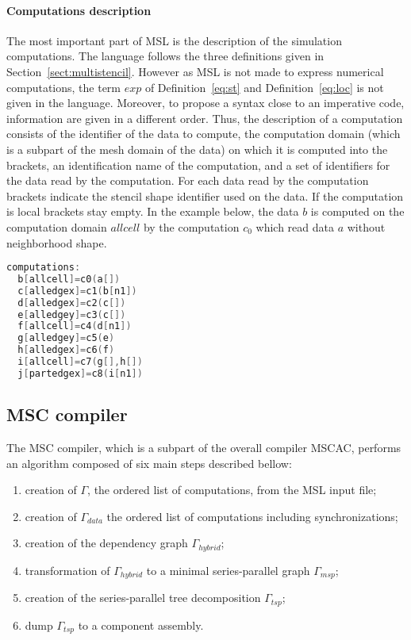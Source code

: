 \paragraph{Computations description} The most important part of MSL is the description of the simulation computations. The language follows the three definitions given in Section~\ref{sect:multistencil}. However as MSL is not made to express numerical computations, the term $exp$ of Definition~\ref{eq:st} and Definition~\ref{eq:loc} is not given in the language. Moreover, to propose a syntax close to an imperative code, information are given in a different order.
Thus, the description of a computation consists of the identifier of the data to compute, the computation domain (which is a subpart of the mesh domain of the data) on which it is computed into the brackets, an identification name of the computation, and a set of identifiers for the data read by the computation. For each data read by the computation brackets indicate the stencil shape identifier used on the data. If the computation is local brackets stay empty. In the example below, the data $b$ is computed on the computation domain $allcell$ by the computation $c_0$ which read data $a$ without neighborhood shape.
\begin{lstlisting}[basicstyle=\small,mathescape,frame=single,language=C++]
computations:
  b[allcell]=c0(a[])
  c[alledgex]=c1(b[n1])
  d[alledgex]=c2(c[])
  e[alledgey]=c3(c[])
  f[allcell]=c4(d[n1])
  g[alledgey]=c5(e)
  h[alledgex]=c6(f)
  i[allcell]=c7(g[],h[])
  j[partedgex]=c8(i[n1])
\end{lstlisting}

\subsection{MSC compiler}
The MSC compiler, which is a subpart of the overall compiler MSCAC, performs an algorithm composed of six main steps described bellow:

\begin{enumerate}
\item creation of $\Gamma$, the ordered list of computations, from the MSL input file;
\item creation of $\Gamma_{data}$ the ordered list of computations including synchronizations;
\item creation of the dependency graph $\Gamma_{hybrid}$;
\item transformation of $\Gamma_{hybrid}$ to a minimal series-parallel graph $\Gamma_{msp}$;
\item creation of the series-parallel tree decomposition $\Gamma_{tsp}$;
\item dump $\Gamma_{tsp}$ to a component assembly.
\end{enumerate}

